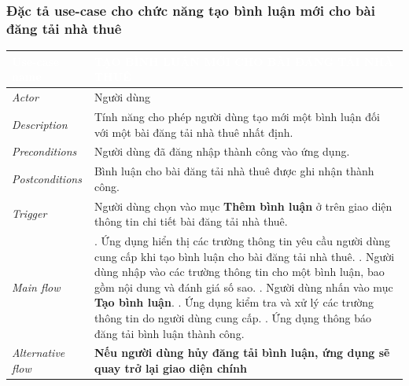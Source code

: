 \subsubsection{Đặc tả use-case cho chức năng tạo bình luận mới cho bài đăng tải nhà thuê}
\begin{center}
    \arrayrulewidth=2pt
    \begin{longtable}{
        |>{\raggedright\arraybackslash}p{3cm}
        |>{\raggedright\arraybackslash}p{13cm}
        |}
        \hline
        \rowcolor{cyan!75!black} \textcolor{white}{\textbf{Use-case name}} & \textcolor{white}{\textbf{TẠO BÌNH LUẬN MỚI CHO BÀI ĐĂNG TẢI NHÀ THUÊ}}
        \\\hline
        \rowcolor{cyan!10!white} \textit{Actor} & Người dùng
        \\\hdashline
        \rowcolor{cyan!10!white} \textit{Description} & Tính năng cho phép người dùng tạo mới một bình luận đối với một bài đăng tải nhà thuê nhất định.
        \\\hdashline
        \rowcolor{cyan!10!white} \textit{Preconditions} & Người dùng đã đăng nhập thành công vào ứng dụng.
        \\\hdashline
        \rowcolor{cyan!10!white} \textit{Postconditions} & Bình luận cho bài đăng tải nhà thuê được ghi nhận thành công.
        \\\hdashline
        \rowcolor{cyan!10!white} \textit{Trigger} & Người dùng chọn vào mục \textbf{Thêm bình luận} ở trên giao diện thông tin chi tiết bài đăng tải nhà thuê.
        \\\hdashline
        \rowcolor{cyan!10!white} \textit{Main flow} &
        1. Ứng dụng hiển thị các trường thông tin yêu cầu người dùng cung cấp khi tạo bình luận cho bài đăng tải nhà thuê. \newline
        2. Người dùng nhập vào các trường thông tin cho một bình luận, bao gồm nội dung và đánh giá số sao. \newline
        3. Người dùng nhấn vào mục \textbf{Tạo bình luận}. \newline
        4. Ứng dụng kiểm tra và xử lý các trường thông tin do người dùng cung cấp. \newline
        5. Ứng dụng thông báo đăng tải bình luận thành công.
        \\\hdashline
        \rowcolor{cyan!10!white} \textit{Alternative flow} & 
        \textbf{Nếu người dùng hủy đăng tải bình luận, ứng dụng sẽ quay trở lại giao diện chính} \newline

\end{longtable}
\end{center}
